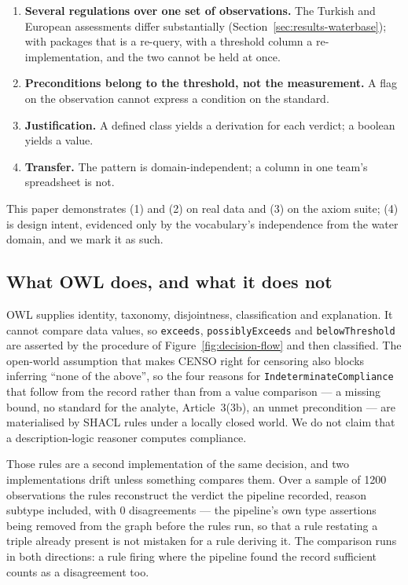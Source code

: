 \begin{enumerate}
  \item \textbf{Several regulations over one set of observations.} The Turkish
    and European assessments differ substantially
    (Section~\ref{sec:results-waterbase}); with packages that is a re-query,
    with a threshold column a re-implementation, and the two cannot be held at
    once.
  \item \textbf{Preconditions belong to the threshold, not the measurement.} A
    flag on the observation cannot express a condition on the standard.
  \item \textbf{Justification.} A defined class yields a derivation for each
    verdict; a boolean yields a value.
  \item \textbf{Transfer.} The pattern is domain-independent; a column in one
    team's spreadsheet is not.
\end{enumerate}

This paper demonstrates (1) and (2) on real data and (3) on the axiom suite;
(4) is design intent, evidenced only by the vocabulary's independence from the
water domain, and we mark it as such.

\subsection{What OWL does, and what it does not}
OWL supplies identity, taxonomy, disjointness, classification and explanation.
It cannot compare data values, so \texttt{exceeds}, \texttt{possiblyExceeds} and
\texttt{belowThreshold} are asserted by the procedure of
Figure~\ref{fig:decision-flow} and then classified. The open-world assumption
that makes CENSO right for censoring also blocks inferring ``none of the
above'', so the four reasons for \texttt{IndeterminateCompliance} that follow
from the record rather than from a value comparison --- a missing bound, no
standard for the analyte, Article~3(3b), an unmet precondition --- are
materialised by SHACL rules under a locally closed world. We do not claim that
a description-logic reasoner computes compliance.

Those rules are a second implementation of the same decision, and two
implementations drift unless something compares them. Over a sample of
\num{1200} observations the rules reconstruct the verdict the pipeline
recorded, reason subtype included, with \num{0} disagreements --- the
pipeline's own type assertions being removed from the graph before the rules
run, so that a rule restating a triple already present is not mistaken for a
rule deriving it. The comparison runs in
both directions: a rule firing where the pipeline found the record sufficient
counts as a disagreement too.

